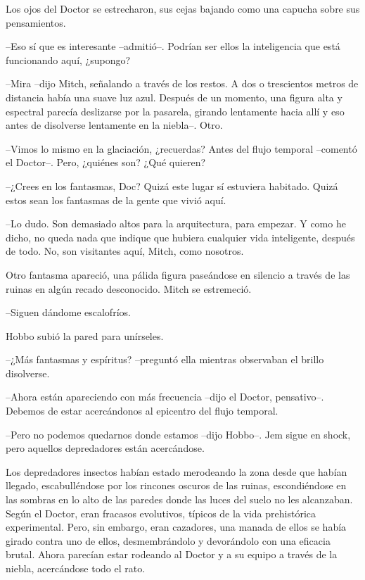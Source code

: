 {Los ojos del Doctor se estrecharon, sus cejas bajando como una capucha
sobre sus pensamientos.}

{--Eso sí que es interesante --admitió--. Podrían ser ellos la
inteligencia que está funcionando aquí, ¿supongo?}

{--Mira --dijo Mitch, señalando a través de los restos. A dos o
 trescientos metros de distancia había una suave luz azul. Después de un
 momento, una figura alta y espectral parecía deslizarse por la pasarela,
 girando lentamente hacia allí y eso antes de disolverse lentamente en la
niebla--. Otro.}

{--Vimos lo mismo en la glaciación, ¿recuerdas? Antes del flujo temporal
--comentó el Doctor--. Pero, ¿quiénes son? ¿Qué quieren?}

{--¿Crees en los fantasmas, Doc? Quizá este lugar sí estuviera habitado.
Quizá estos sean los fantasmas de la gente que vivió aquí.}

{--Lo dudo. Son demasiado altos para la arquitectura, para empezar. Y
 como he dicho, no queda nada que indique que hubiera cualquier vida
 inteligente, después de todo. No, son visitantes aquí, Mitch, como
nosotros.}

{Otro fantasma apareció, una pálida figura paseándose en silencio a
través de las ruinas en algún recado desconocido. Mitch se estremeció.}

{--Siguen dándome escalofríos.}

{Hobbo subió la pared para unírseles.}

{--¿Más fantasmas y espíritus? --preguntó ella mientras observaban el
brillo disolverse.}

{--Ahora están apareciendo con más frecuencia --dijo el Doctor,
 pensativo--. Debemos de estar acercándonos al epicentro del flujo
temporal.}

{--Pero no podemos quedarnos donde estamos --dijo Hobbo--. Jem sigue en
shock, pero aquellos depredadores están acercándose.}

{Los depredadores insectos habían estado merodeando la zona desde que
 habían llegado, escabulléndose por los rincones oscuros de las ruinas,
 escondiéndose en las sombras en lo alto de las paredes donde las luces
 del suelo no les alcanzaban. Según el Doctor, eran fracasos evolutivos,
 típicos de la vida prehistórica experimental. Pero, sin embargo, eran
 cazadores, una manada de ellos se había girado contra uno de ellos,
 desmembrándolo y devorándolo con una eficacia brutal. Ahora parecían
 estar rodeando al Doctor y a su equipo a través de la niebla,
acercándose todo el rato.}


